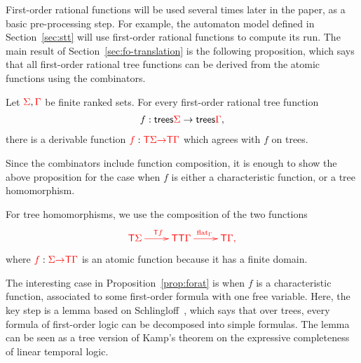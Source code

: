 
First-order rational functions will be used several times later in the paper, as a basic pre-processing step. For example, the automaton model defined in Section~\ref{sec:stt} will use first-order rational functions to compute its run.
The main  result of Section~\ref{sec:fo-translation} is the following proposition, which says  that all first-order rational tree functions can be derived from the atomic functions using the combinators. 
\begin{proposition} \label{prop:forat}    
    Let ${\color{red}{\Sigma}},{\color{red}{\Gamma}}$ be finite ranked sets. 
    For every  first-order rational tree function 
    \begin{align*}
        f : \mathsf {trees} {\color{red}{\Sigma}} \to \mathsf {trees} {\color{red}{\Gamma}},
    \end{align*}
    there is a derivable function ${\color{red}{f}} : {\color{red}{\mathsf T}} {\color{red}{\Sigma}} {\color{red}{\to}} {\color{red}{\mathsf T}} {\color{red}{\Gamma}}$ which agrees with $f$ on trees.
\end{proposition}       
Since the combinators include function composition, it is enough to show the above proposition for the case when $f$ is either a characteristic function, or a tree homomorphism. 

For tree homomorphisms, we use the composition of the two functions
\begin{align*}
    \ranked{
    \xymatrix{
        \tmonad \rSigma \ar[r]^{\tmonad \ranked f} & \tmonad \tmonad \rGamma \ar[r]^{\flatt_\rGamma} & \tmonad \rGamma,
    }}
\end{align*}
where ${\color{red}{f}} : {\color{red}{\Sigma}} {\color{red}{\to}} {\color{red}{\mathsf T}} {\color{red}{\Gamma}}$ is an atomic function because it has a finite domain.  

The interesting case in Proposition~\ref{prop:forat} is when $f$ is a characteristic function, associated to some first-order formula with one free variable. Here, the key step is a lemma based on Schlingloff~\cite[Theorem 2.6]{schlingloff1992expressive}, which says that  over trees, every formula of first-order logic can be decomposed into simple formulas.  The lemma can be seen as a tree version of Kamp's theorem on the expressive completeness of linear temporal logic.


